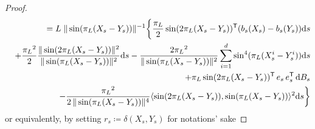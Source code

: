 \documentclass[final,12pt]{colt2023} %
\newcommand{\bes}{\begin{equation}}
\newcommand{\ees}{\end{equation}}
\newcommand{\De}{\mathrm{d}}
\def\eqsp{\;}
\begin{document}
\begin{proof}
\bes
\begin{split}
\phantom{\De\delta(X_s,Y_s)  } =L\eqsp\|\sin({\pi_L}(X_s-Y_s))\|^{-1}\biggl\{\frac{{\pi_L}}{2}\sin(2{\pi_L}(X_s-Y_s))^{{\sf  T}}(b_s(X_s)-b_s(Y_s))\De s\\
+\frac{{\pi_L}^2}{2}\frac{\|\sin(2{\pi_L}(X_s-Y_s))\|^2}{\|\sin({\pi_L}(X_s-Y_s))\|^2}\De s- \frac{2{\pi_L}^2}{\|\sin({\pi_L}(X_s-Y_s))\|^2}\sum_{i=1}^d\sin^4({\pi_L}(X_s^i-Y_s^i))\De s\\
+{\pi_L}\sin(2{\pi_L}(X_s-Y_s))^{{\sf  T}}\,e_s\,e_s^{{\sf  T}}\,\De B_s\\
-\frac{{\pi_L}^2}{2\,\|\sin({\pi_L}(X_s-Y_s))\|^{4}}\langle \sin(2{\pi_L}(X_s-Y_s)),\sin({\pi_L}(X_s-Y_s))\rangle^2\De s\biggr\}
\end{split}
\ees
or equivalently, by setting $r_s\coloneqq \delta(X_s,Y_s)$ for notations' sake


\end{proof}
\end{document}
